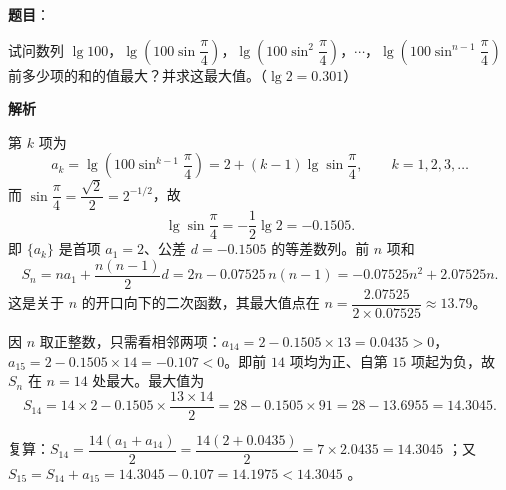 \begin{answer}

\textbf{题目}：

试问数列 $\lg100$，$\lg\left(100\sin\dfrac{\pi}{4}\right)$，$\lg\left(100\sin^2\dfrac{\pi}{4}\right)$，$\cdots$，$\lg\left(100\sin^{n-1}\dfrac{\pi}{4}\right)$ 前多少项的和的值最大？并求这最大值。（$\lg2=0.301$）

\textbf{解析}

第 $k$ 项为
\nopagebreak[4]
\[
a_k=\lg\left(100\sin^{k-1}\frac\pi4\right)=2+(k-1)\lg\sin\frac\pi4,\qquad k=1,2,3,\dots
\]
而 $\sin\dfrac\pi4=\dfrac{\sqrt2}{2}=2^{-1/2}$，故
\nopagebreak[4]
\[
\lg\sin\frac\pi4=-\frac12\lg2=-0.1505.
\]
即 $\{a_k\}$ 是首项 $a_1=2$、公差 $d=-0.1505$ 的等差数列。前 $n$ 项和
\nopagebreak[4]
\[
S_n=na_1+\frac{n(n-1)}2d=2n-0.07525\,n(n-1)=-0.07525n^2+2.07525n.
\]
这是关于 $n$ 的开口向下的二次函数，其最大值点在 $n=\dfrac{2.07525}{2\times0.07525}\approx13.79$。

因 $n$ 取正整数，只需看相邻两项：$a_{14}=2-0.1505\times13=0.0435>0$，$a_{15}=2-0.1505\times14=-0.107<0$。即前 $14$ 项均为正、自第 $15$ 项起为负，故 $S_n$ 在 $n=14$ 处最大。最大值为
\nopagebreak[4]
\[
S_{14}=14\times2-0.1505\times\frac{13\times14}{2}=28-0.1505\times91=28-13.6955=14.3045.
\]

复算：$S_{14}=\dfrac{14(a_1+a_{14})}2=\dfrac{14(2+0.0435)}2=7\times2.0435=14.3045$ ；又 $S_{15}=S_{14}+a_{15}=14.3045-0.107=14.1975<14.3045$ 。


\end{answer}
